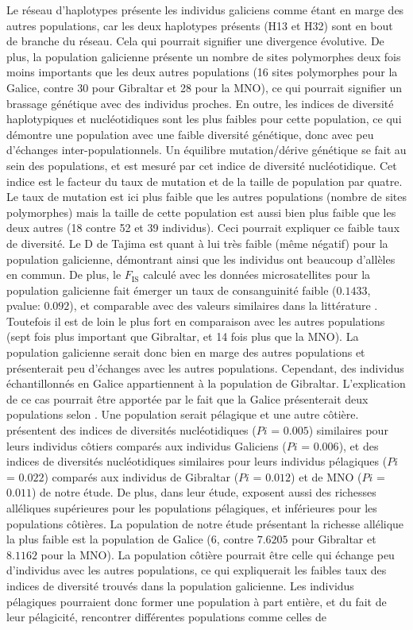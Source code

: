 \documentclass[a4paper,12pt,twoside]{article}\usepackage[]{graphicx}\usepackage[]{color}
\begin{document}
\begin {bibunit} [newbst]
Le réseau d'haplotypes présente les individus galiciens comme étant en marge des autres populations, car les deux haplotypes présents (H13 et H32) sont en bout de branche du réseau. Cela qui pourrait signifier une divergence évolutive. De plus, la population galicienne présente un nombre de sites polymorphes deux fois moins importants que les deux autres populations (16 sites polymorphes pour la Galice, contre 30 pour Gibraltar et 28 pour la MNO), ce qui pourrait signifier un brassage génétique avec des individus proches. En outre, les indices de diversité haplotypiques et nucléotidiques sont les plus faibles pour cette population, ce qui démontre une population avec une faible diversité génétique, donc avec peu d'échanges inter-populationnels. Un équilibre mutation/dérive génétique se fait au sein des populations, et est mesuré par cet indice de diversité nucléotidique. Cet indice est le facteur du taux de mutation et de la taille de population par quatre. Le taux de mutation est ici plus faible que les autres populations (nombre de sites polymorphes) mais la taille de cette population est aussi bien plus faible que les deux autres (18 contre 52 et 39 individus). Ceci pourrait expliquer ce faible taux de diversité. Le D de Tajima est quant à lui très faible (même négatif) pour la population galicienne, démontrant ainsi que les individus ont beaucoup d'allèles en commun. De plus, le $F_\textrm{IS}$ calculé avec les données microsatellites pour la population galicienne fait émerger un taux de consanguinité faible ($0.1433$, pvalue: $0.092$), et comparable avec des valeurs similaires dans la littérature \citep{louis2014, phdLouis2014}. Toutefois il est de loin le plus fort en comparaison avec les autres populations (sept fois plus important que Gibraltar, et 14 fois plus que la MNO). La population galicienne serait donc bien en marge des autres populations et présenterait peu d'échanges avec les autres populations. Cependant, des individus échantillonnés en Galice appartiennent à la population de Gibraltar. L'explication de ce cas pourrait être apportée par le fait que la Galice présenterait deux populations selon \citet{louis2014}. Une population serait pélagique et une autre côtière. \citet{lowther2014} présentent des indices de diversités nucléotidiques ($Pi$ = $0.005$) similaires pour leurs individus côtiers comparés aux individus Galiciens ($Pi$ = $0.006$), et des indices de diversités nucléotidiques similaires pour leurs individus pélagiques ($Pi$ = $0.022$) comparés aux individus de Gibraltar ($Pi$ = $0.012$) et de MNO ($Pi$ = $0.011$) de notre étude. De plus, dans leur étude, \citet{lowther2014} exposent aussi des richesses alléliques supérieures pour les populations pélagiques, et inférieures pour les populations côtières. La population de notre étude présentant la richesse allélique la plus faible est la population de Galice ($6$, contre $7.6205$ pour Gibraltar et $8.1162$ pour la MNO). La population côtière pourrait être celle qui échange peu d'individus avec les autres populations, ce qui expliquerait les faibles taux des indices de diversité trouvés dans la population galicienne. Les individus pélagiques pourraient donc former une population à part entière, et du fait de leur pélagicité, rencontrer différentes populations comme celles de 
\end{bibunit}
\end{document}
